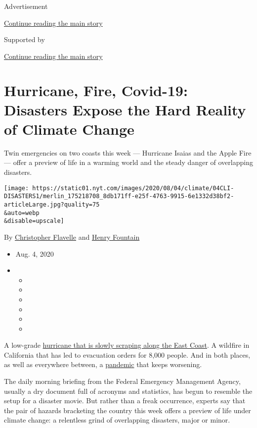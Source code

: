 Advertisement

\protect\hyperlink{after-top}{Continue reading the main story}

Supported by

\protect\hyperlink{after-sponsor}{Continue reading the main story}

\hypertarget{hurricane-fire-covid-19-disasters-expose-the-hard-reality-of-climate-change}{%
\section{Hurricane, Fire, Covid-19: Disasters Expose the Hard Reality of
Climate
Change}\label{hurricane-fire-covid-19-disasters-expose-the-hard-reality-of-climate-change}}

Twin emergencies on two coasts this week --- Hurricane Isaias and the
Apple Fire --- offer a preview of life in a warming world and the steady
danger of overlapping disasters.

\texttt{[image: https://static01.nyt.com/images/2020/08/04/climate/04CLI-DISASTERS1/merlin\_175218708\_8db171ff-e25f-4763-9915-6e1332d38bf2-articleLarge.jpg?quality=75\\\&auto=webp\\\&disable=upscale]}

By \href{https://www.nytimes.com/by/christopher-flavelle}{Christopher
Flavelle} and \href{https://www.nytimes.com/by/henry-fountain}{Henry
Fountain}

\begin{itemize}
\item
  Aug. 4, 2020
\item
  \begin{itemize}
  \item
  \item
  \item
  \item
  \item
  \item
  \end{itemize}
\end{itemize}

A low-grade
\href{https://www.nytimes.com/2020/08/04/us/isaias-storm-updates.html}{hurricane
that is slowly scraping along the East Coast}. A wildfire in California
that has led to evacuation orders for 8,000 people. And in both places,
as well as everywhere between, a
\href{https://www.nytimes.com/interactive/2020/world/coronavirus-maps.html}{pandemic}
that keeps worsening.

The daily morning briefing from the Federal Emergency Management Agency,
usually a dry document full of acronyms and statistics, has begun to
resemble the setup for a disaster movie. But rather than a freak
occurrence, experts say that the pair of hazards bracketing the country
this week offers a preview of life under climate change: a relentless
grind of overlapping disasters, major or minor.

